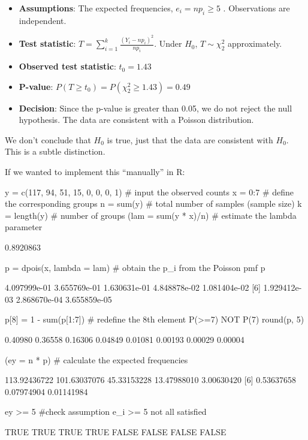 \documentclass[a4paper]{article}\usepackage[]{graphicx}\usepackage[]{xcolor}
\begin{document}
\begin{itemize}
	\item \textbf{Assumptions}: The expected frequencies, \( e_i = np_i \geq 5 \) . Observations are independent.
	\item \textbf{Test statistic}: \( T=\sum\limits_{i=1}^k \frac{(Y_i-n p_i)^2}{n p_i} \). Under \( H_0 \), \( T \sim \chi^2_2 \) approximately.
	\item \textbf{Observed test statistic}: \( t_0 = 1.43 \) 
	\item \textbf{P-value}: \( P(T \geq t_0) = P(\chi_2^2 \geq 1.43) = 0.49 \) 
	\item \textbf{Decision}: Since the p-value is greater than 0.05, we do not reject the null hypothesis. The data are consistent with a Poisson distribution.
\end{itemize}
\begin{goldbox}
	We don't conclude that \( H_0 \) is true, just that the data are consistent with \( H_0 \). This is a subtle distinction.
\end{goldbox}
If we wanted to implement this ``manually'' in R:
\begin{Schunk}
\begin{Sinput}
y = c(117, 94, 51, 15, 0, 0, 0, 1) # input the observed counts
x = 0:7 # define the corresponding groups
n = sum(y) # total number of samples (sample size)
k = length(y) # number of groups
(lam = sum(y * x)/n) # estimate the lambda parameter
\end{Sinput}
\begin{Soutput}
[1] 0.8920863
\end{Soutput}
\begin{Sinput}
p = dpois(x, lambda = lam) # obtain the p_i from the Poisson pmf
p
\end{Sinput}
\begin{Soutput}
[1] 4.097999e-01 3.655769e-01 1.630631e-01 4.848878e-02 1.081404e-02
[6] 1.929412e-03 2.868670e-04 3.655859e-05
\end{Soutput}
\begin{Sinput}
p[8] = 1 - sum(p[1:7]) # redefine the 8th element P(>=7) NOT P(7)
round(p, 5)
\end{Sinput}
\begin{Soutput}
[1] 0.40980 0.36558 0.16306 0.04849 0.01081 0.00193 0.00029 0.00004
\end{Soutput}
\begin{Sinput}
(ey = n * p) # calculate the expected frequencies
\end{Sinput}
\begin{Soutput}
[1] 113.92436722 101.63037076  45.33153228  13.47988010   3.00630420
[6]   0.53637658   0.07974904   0.01141984
\end{Soutput}
\begin{Sinput}
ey >= 5 #check assumption e_i >= 5 not all satisfied
\end{Sinput}
\begin{Soutput}
[1]  TRUE  TRUE  TRUE  TRUE FALSE FALSE FALSE FALSE
\end{Soutput}
\end{Schunk}
\end{document}
